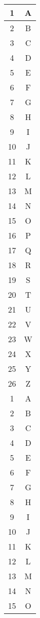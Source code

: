 \begin{table}[H]
	\centering
	\begin{tabular}{|c|c|}
		\hline
		1 & A \\
		\hline
		2 & B \\
		\hline
		3 & C \\
		\hline
		4 & D \\
		\hline
		5 & E \\
		\hline
		6 & F \\
		\hline
		7 & G \\
		\hline
		8 & H \\
		\hline
		9 & I \\
		\hline
		10 & J \\
		\hline
		11 & K \\
		\hline
		12 & L \\
		\hline
		13 & M \\
		\hline
		14 & N \\
		\hline
		15 & O \\
		\hline
		16 & P \\
		\hline
		17 & Q \\
		\hline
		18 & R \\
		\hline
		19 & S \\
		\hline
		20 & T \\
		\hline
		21 & U \\
		\hline
		22 & V \\
		\hline
		23 & W \\
		\hline
		24 & X \\
		\hline
		25 & Y \\
		\hline
		26 & Z \\
		\hline
		1 & A \\
		\hline
		2 & B \\
		\hline
		3 & C \\
		\hline
		4 & D \\
		\hline
		5 & E \\
		\hline
		6 & F \\
		\hline
		7 & G \\
		\hline
		8 & H \\
		\hline
		9 & I \\
		\hline
		10 & J \\
		\hline
		11 & K \\
		\hline
		12 & L \\
		\hline
		13 & M \\
		\hline
		14 & N \\
		\hline
		15 & O \\

\end{tabular}
\end{table}
